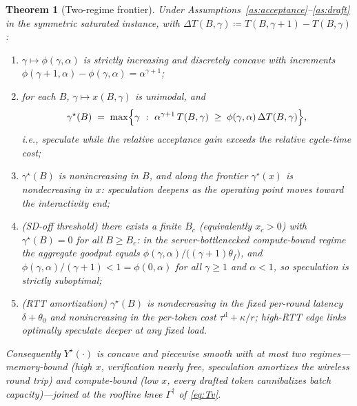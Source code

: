 \documentclass[11pt]{article}
\newtheorem{theorem}{Theorem}
\theoremstyle{definition}
\theoremstyle{remark}
\begin{document}
\begin{theorem}[Two-regime frontier]\label{thm:frontier}
Under Assumptions~\ref{as:acceptance}--\ref{as:draft} in the symmetric
saturated instance, with $\Delta T(B,\gamma)\coloneqq
T(B,\gamma+1)-T(B,\gamma)$:
\begin{enumerate}[label=(\alph*),leftmargin=2em,itemsep=1pt,topsep=2pt]
\item $\gamma\mapsto\phi(\gamma,\alpha)$ is strictly increasing and
discretely concave with increments
$\phi(\gamma+1,\alpha)-\phi(\gamma,\alpha)=\alpha^{\gamma+1}$;
\item for each $B$, $\gamma\mapsto x(B,\gamma)$ is unimodal, and
\begin{equation}\label{eq:gammastar}
\gamma^{\star}(B)\;=\;\max\Bigl\{\gamma\ :\
\alpha^{\gamma+1}\,T(B,\gamma)\;\ge\;\phi(\gamma,\alpha)\,\Delta T(B,\gamma)
\Bigr\},
\end{equation}
i.e., speculate while the relative acceptance gain exceeds the relative
cycle-time cost;
\item $\gamma^{\star}(B)$ is nonincreasing in $B$, and along the frontier
$\gamma^{\star}(x)$ is nondecreasing in $x$: speculation deepens as the
operating point moves toward the interactivity end;
\item \emph{(SD-off threshold)} there exists a finite $B_c$ (equivalently
$x_c>0$) with $\gamma^{\star}(B)=0$ for all $B\ge B_c$: in the
server-bottlenecked compute-bound regime the aggregate goodput equals
$\phi(\gamma,\alpha)\big/\bigl((\gamma+1)\theta_f\bigr)$, and
$\phi(\gamma,\alpha)/(\gamma+1)<1=\phi(0,\alpha)$ for all $\gamma\ge1$ and
$\alpha<1$, so speculation is strictly suboptimal;
\item \emph{(RTT amortization)} $\gamma^{\star}(B)$ is nondecreasing in the
fixed per-round latency $\delta+\theta_0$ and nonincreasing in the per-token
cost $\tau^{\mathrm{d}}+\kappa/r$; high-RTT edge links optimally speculate
deeper at any fixed load.
\end{enumerate}
Consequently $Y^{\star}(\cdot)$ is concave and piecewise smooth with at most
two regimes---memory-bound (high $x$, verification nearly free, speculation
amortizes the wireless round trip) and compute-bound (low $x$, every drafted
token cannibalizes batch capacity)---joined at the roofline knee
$\Gamma^{\dagger}$ of \eqref{eq:Tv}.
\end{theorem}
\end{document}
